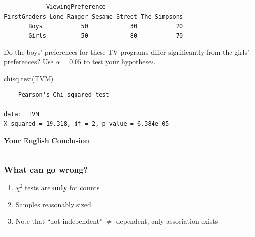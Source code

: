 \documentclass[
]{article}
\newenvironment{Shaded}{\begin{snugshade}}{\end{snugshade}}
\newcommand{\FunctionTok}[1]{\textcolor[rgb]{0.00,0.00,0.00}{#1}}
\newcommand{\NormalTok}[1]{#1}
\providecommand{\tightlist}{%
  \setlength{\itemsep}{0pt}\setlength{\parskip}{0pt}}
\begin{document}
\begin{verbatim}
            ViewingPreference
FirstGraders Lone Ranger Sesame Street The Simpsons
       Boys           50            30           20
       Girls          50            80           70
\end{verbatim}

Do the boys' preferences for these TV programs differ significantly from the girls' preferences? Use \(\alpha= 0.05\) to test your hypotheses.

\begin{Shaded}
\begin{Highlighting}[]
\FunctionTok{chisq.test}\NormalTok{(TVM)}
\end{Highlighting}
\end{Shaded}

\begin{verbatim}
    Pearson's Chi-squared test

data:  TVM
X-squared = 19.318, df = 2, p-value = 6.384e-05
\end{verbatim}

\textbf{Your English Conclusion}

\begin{center}\rule{0.5\linewidth}{0.5pt}\end{center}

\hypertarget{what-can-go-wrong}{%
\subsubsection*{What can go wrong?}\label{what-can-go-wrong}}

\begin{enumerate}
\def\labelenumi{\arabic{enumi}.}
\tightlist
\item
  \(\chi^2\) tests are \textbf{only} for counts
\item
  Samples reasonably sized
\item
  Note that ``not independent'' \(\neq\) dependent, only association exists
\end{enumerate}

\begin{center}\rule{0.5\linewidth}{0.5pt}\end{center}
\end{document}
